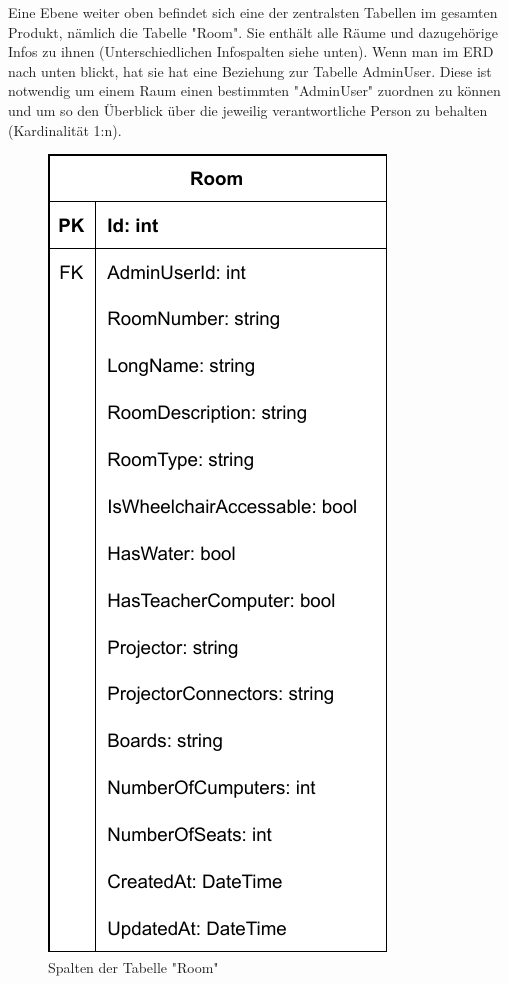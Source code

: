 
Eine Ebene weiter oben befindet sich eine der zentralsten Tabellen im gesamten Produkt, nämlich die Tabelle "Room". Sie enthält alle Räume und dazugehörige Infos zu ihnen (Unterschiedlichen Infospalten siehe unten). Wenn man im ERD nach unten blickt, hat sie hat eine Beziehung zur Tabelle AdminUser. Diese ist notwendig um einem Raum einen bestimmten "AdminUser" zuordnen zu können und um so den Überblick über die jeweilig verantwortliche Person zu behalten (Kardinalität 1:n).

\begin{figure}[H]
    \centering
    \includegraphics{media/MariaDB/Room.svg.pdf}
    \caption{Spalten der Tabelle "Room"}
\end{figure}

